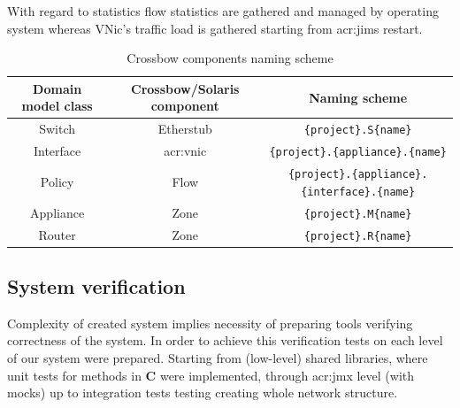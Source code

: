 \documentclass[11pt]{book}
\begin{document}
			With regard to statistics flow statistics are gathered and managed by operating system whereas 
			VNic's traffic load is gathered starting from \gls{acr:jims} restart.

          \begin{table}[H]


            \centering
          
            \begin{tabular}{|c|c|c|}
              \hline
              Domain model class & Crossbow/Solaris component & Naming scheme                                             \\
              \hline \hline
              Switch             & Etherstub                  & \texttt{\{project\}.S\{name\}}                            \\
              \hline
              Interface          & \gls{acr:vnic}             & \texttt{\{project\}.\{appliance\}.\{name\}}               \\
              \hline
              Policy             & Flow                       & \texttt{\{project\}.\{appliance\}.\{interface\}.\{name\}} \\
              \hline
              Appliance          & Zone                       & \texttt{\{project\}.M\{name\}}                            \\
              \hline
              Router             & Zone                       & \texttt{\{project\}.R\{name\}}                            \\
              \hline
            \end{tabular}

            \caption{Crossbow components naming scheme}
            \label{tab:impl:naming}
          
          \end{table}
		
		\subsection{System verification}
			\label{sec:impl:verif}
		
      Complexity of created system implies necessity of preparing tools verifying correctness of the system. In order to
      achieve this verification tests on each level of our system were prepared. Starting from (low-level) shared
      libraries, where unit tests for methods in \textbf{C} were implemented, through \gls{acr:jmx} level (with mocks)
      up to integration tests testing creating whole network structure.
		
\end{document}
